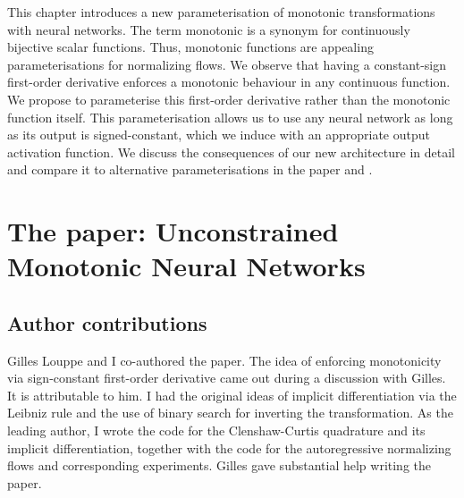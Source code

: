 This chapter introduces a new parameterisation of monotonic transformations with neural networks. The term monotonic is a synonym for continuously bijective scalar functions. Thus, monotonic functions are appealing parameterisations for normalizing flows. We observe that having a constant-sign first-order derivative enforces a monotonic behaviour in any continuous function. We propose to parameterise this first-order derivative rather than the monotonic function itself. This parameterisation allows us to use any neural network as long as its output is signed-constant, which we induce with an appropriate output activation function. We discuss the consequences of our new architecture in detail and compare it to alternative parameterisations in the paper and .

%


\section{The paper: Unconstrained Monotonic Neural Networks}
\subsection{Author contributions}
Gilles Louppe and I co-authored the paper. The idea of enforcing monotonicity via sign-constant first-order derivative came out during a discussion with Gilles. It is attributable to him. I had the original ideas of implicit differentiation via the Leibniz rule and the use of binary search for inverting the transformation. As the leading author, I wrote the code for the Clenshaw-Curtis quadrature and its implicit differentiation, together with the code for the autoregressive normalizing flows and corresponding experiments. Gilles gave substantial help writing the paper.

